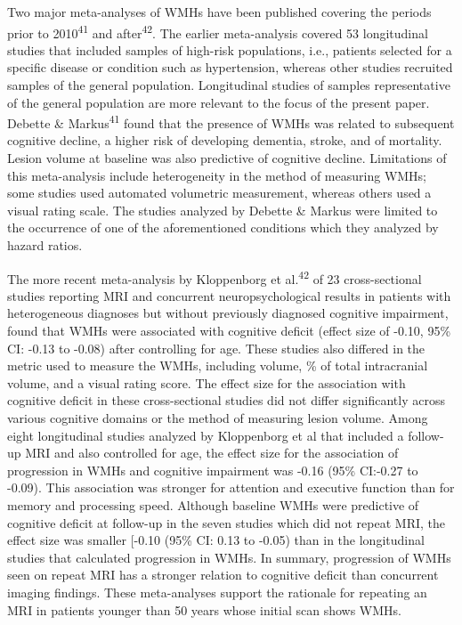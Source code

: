\documentclass[11pt,]{article}
\begin{document}
Two major meta-analyses of WMHs have been published covering the periods
prior to 2010\textsuperscript{41} and after\textsuperscript{42}. The
earlier meta-analysis covered 53 longitudinal studies that included
samples of high-risk populations, i.e., patients selected for a specific
disease or condition such as hypertension, whereas other studies
recruited samples of the general population. Longitudinal studies of
samples representative of the general population are more relevant to
the focus of the present paper. Debette \& Markus\textsuperscript{41}
found that the presence of WMHs was related to subsequent cognitive
decline, a higher risk of developing dementia, stroke, and of mortality.
Lesion volume at baseline was also predictive of cognitive decline.
Limitations of this meta-analysis include heterogeneity in the method of
measuring WMHs; some studies used automated volumetric measurement,
whereas others used a visual rating scale. The studies analyzed by
Debette \& Markus were limited to the occurrence of one of the
aforementioned conditions which they analyzed by hazard ratios.

The more recent meta-analysis by Kloppenborg et al.\textsuperscript{42}
of 23 cross-sectional studies reporting MRI and concurrent
neuropsychological results in patients with heterogeneous diagnoses but
without previously diagnosed cognitive impairment, found that WMHs were
associated with cognitive deficit (effect size of -0.10, 95\% CI: -0.13
to -0.08) after controlling for age. These studies also differed in the
metric used to measure the WMHs, including volume, \% of total
intracranial volume, and a visual rating score. The effect size for the
association with cognitive deficit in these cross-sectional studies did
not differ significantly across various cognitive domains or the method
of measuring lesion volume. Among eight longitudinal studies analyzed by
Kloppenborg et al that included a follow-up MRI and also controlled for
age, the effect size for the association of progression in WMHs and
cognitive impairment was -0.16 (95\% CI:-0.27 to -0.09). This
association was stronger for attention and executive function than for
memory and processing speed. Although baseline WMHs were predictive of
cognitive deficit at follow-up in the seven studies which did not repeat
MRI, the effect size was smaller {[}-0.10 (95\% CI: 0.13 to -0.05) than
in the longitudinal studies that calculated progression in WMHs. In
summary, progression of WMHs seen on repeat MRI has a stronger relation
to cognitive deficit than concurrent imaging findings. These
meta-analyses support the rationale for repeating an MRI in patients
younger than 50 years whose initial scan shows WMHs.
\end{document}
